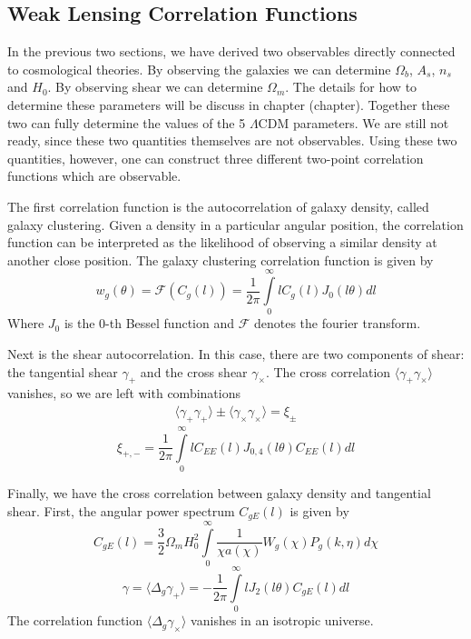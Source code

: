 \subsection{Weak Lensing Correlation Functions}
In the previous two sections, we have derived two observables directly connected to cosmological theories. By observing the galaxies we can determine $\Omega_b$, $A_s$, $n_s$ and $H_0$. By observing shear we can determine $\Omega_m$. The details for how to determine these parameters will be discuss in chapter (chapter). Together these two can fully determine the values of the 5 $\Lambda$CDM parameters. We are still not ready, since these two quantities themselves are not observables. Using these two quantities, however, one can construct three different two-point correlation functions which are observable.

The first correlation function is the autocorrelation of galaxy density, called galaxy clustering. Given a density in a particular angular position, the correlation function can be interpreted as the likelihood of observing a similar density at another close position. The galaxy clustering correlation function is given by
\begin{equation}
	w_g(\theta) = \mathcal{F}(C_g(l)) = \frac{1}{2\pi}\int\limits_0^\infty l C_g(l) J_0(l\theta)dl
\end{equation}
Where $J_0$ is the 0-th Bessel function and $\mathcal{F}$ denotes the fourier transform.

Next is the shear autocorrelation. In this case, there are two components of shear: the tangential shear $\gamma_+$ and the cross shear $\gamma_\times$. The cross correlation $\langle \gamma_+ \gamma_\times \rangle$ vanishes, so we are left with combinations
\begin{equation}
	\begin{split}
		\langle \gamma_+\gamma_+ \rangle \pm \langle \gamma_\times \gamma_\times \rangle = \xi_\pm
	\end{split}
\end{equation}
\begin{equation}
	\xi_{+,-} = \frac{1}{2\pi}\int\limits_0^\infty l C_{EE}(l) J_{0,4}(l\theta)C_{EE}(l)dl
\end{equation}

Finally, we have the cross correlation between galaxy density and tangential shear. First, the angular power spectrum $C_{gE}(l)$ is given by
\begin{equation}
	C_{gE}(l) = \frac{3}{2}\Omega_mH_0^2 \int\limits_0^\infty \frac{1}{\chi a(\chi)}W_g(\chi)P_g(k,\eta) d\chi
\end{equation}
\begin{equation}
	\gamma = \langle \Delta_g\gamma_+\rangle = -\frac{1}{2\pi}\int\limits_0^\infty l J_2(l\theta)C_{gE}(l)dl
\end{equation}
The correlation function $\langle \Delta_g\gamma_\times\rangle$ vanishes in an isotropic universe.

